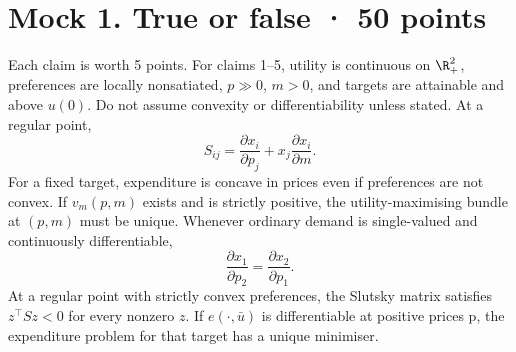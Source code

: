 \section*{Mock 1. True or false · 50 points}
Each claim is worth 5 points. For claims 1--5, utility is continuous on
$\R_+^2$, preferences are locally nonsatiated, $p\gg0$, $m>0$, and targets
are attainable and above $u(0)$. Do not assume convexity or differentiability
unless stated. At a regular point,
\[
 S_{ij}=\frac{\partial x_i}{\partial p_j}
       +x_j\frac{\partial x_i}{\partial m}.
\]
For a fixed target, expenditure is concave in prices even if preferences
are not convex.
If $v_m(p,m)$ exists and is strictly positive, the utility-maximising bundle
at $(p,m)$ must be unique.
Whenever ordinary demand is single-valued and continuously differentiable,
\[
 \frac{\partial x_1}{\partial p_2}=\frac{\partial x_2}{\partial p_1}.
\]
At a regular point with strictly convex preferences, the Slutsky matrix
satisfies $z^\top Sz<0$ for every nonzero $z$.
If $e(\cdot,\bar u)$ is differentiable at positive prices p, the expenditure
problem for that target has a unique minimiser.
